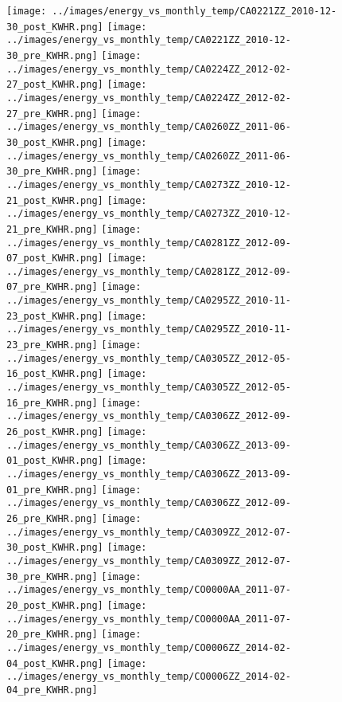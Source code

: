 \clearpage
\begin{figure}
\centering
\texttt{[image: ../images/energy\_vs\_monthly\_temp/CA0221ZZ\_2010-12-30\_post\_KWHR.png]}
\texttt{[image: ../images/energy\_vs\_monthly\_temp/CA0221ZZ\_2010-12-30\_pre\_KWHR.png]}
\texttt{[image: ../images/energy\_vs\_monthly\_temp/CA0224ZZ\_2012-02-27\_post\_KWHR.png]}
\texttt{[image: ../images/energy\_vs\_monthly\_temp/CA0224ZZ\_2012-02-27\_pre\_KWHR.png]}
\texttt{[image: ../images/energy\_vs\_monthly\_temp/CA0260ZZ\_2011-06-30\_post\_KWHR.png]}
\texttt{[image: ../images/energy\_vs\_monthly\_temp/CA0260ZZ\_2011-06-30\_pre\_KWHR.png]}
\texttt{[image: ../images/energy\_vs\_monthly\_temp/CA0273ZZ\_2010-12-21\_post\_KWHR.png]}
\texttt{[image: ../images/energy\_vs\_monthly\_temp/CA0273ZZ\_2010-12-21\_pre\_KWHR.png]}
\texttt{[image: ../images/energy\_vs\_monthly\_temp/CA0281ZZ\_2012-09-07\_post\_KWHR.png]}
\texttt{[image: ../images/energy\_vs\_monthly\_temp/CA0281ZZ\_2012-09-07\_pre\_KWHR.png]}
\texttt{[image: ../images/energy\_vs\_monthly\_temp/CA0295ZZ\_2010-11-23\_post\_KWHR.png]}
\texttt{[image: ../images/energy\_vs\_monthly\_temp/CA0295ZZ\_2010-11-23\_pre\_KWHR.png]}
\texttt{[image: ../images/energy\_vs\_monthly\_temp/CA0305ZZ\_2012-05-16\_post\_KWHR.png]}
\texttt{[image: ../images/energy\_vs\_monthly\_temp/CA0305ZZ\_2012-05-16\_pre\_KWHR.png]}
\texttt{[image: ../images/energy\_vs\_monthly\_temp/CA0306ZZ\_2012-09-26\_post\_KWHR.png]}
\texttt{[image: ../images/energy\_vs\_monthly\_temp/CA0306ZZ\_2013-09-01\_post\_KWHR.png]}
\texttt{[image: ../images/energy\_vs\_monthly\_temp/CA0306ZZ\_2013-09-01\_pre\_KWHR.png]}
\texttt{[image: ../images/energy\_vs\_monthly\_temp/CA0306ZZ\_2012-09-26\_pre\_KWHR.png]}
\texttt{[image: ../images/energy\_vs\_monthly\_temp/CA0309ZZ\_2012-07-30\_post\_KWHR.png]}
\texttt{[image: ../images/energy\_vs\_monthly\_temp/CA0309ZZ\_2012-07-30\_pre\_KWHR.png]}
\texttt{[image: ../images/energy\_vs\_monthly\_temp/CO0000AA\_2011-07-20\_post\_KWHR.png]}
\texttt{[image: ../images/energy\_vs\_monthly\_temp/CO0000AA\_2011-07-20\_pre\_KWHR.png]}
\texttt{[image: ../images/energy\_vs\_monthly\_temp/CO0006ZZ\_2014-02-04\_post\_KWHR.png]}
\texttt{[image: ../images/energy\_vs\_monthly\_temp/CO0006ZZ\_2014-02-04\_pre\_KWHR.png]}
\end{figure}
